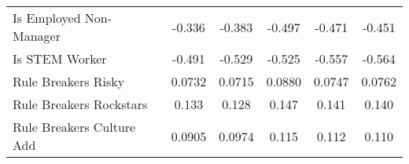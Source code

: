 {\begin{center}
{\begin{longtable}{l*{5}{c}}
            \addlinespace

            Is Employed Non-Manager          & -0.336                & -0.383\sym{*}         & -0.497\sym{**}        & -0.471\sym{**}        & -0.451\sym{**}        \\
            \addlinespace
            Is STEM Worker                   & -0.491\sym{**}        & -0.529\sym{**}        & -0.525\sym{**}        & -0.557\sym{**}        & -0.564\sym{**}        \\

            \addlinespace
            Rule Breakers Risky              & 0.0732\sym{*}         & 0.0715\sym{*}         & 0.0880\sym{**}        & 0.0747\sym{*}         & 0.0762\sym{*}         \\
            \addlinespace
            Rule Breakers Rockstars          & 0.133\sym{**}         & 0.128\sym{**}         & 0.147\sym{**}         & 0.141\sym{**}         & 0.140\sym{**}         \\
            \addlinespace
            Rule Breakers Culture Add        & 0.0905                & 0.0974\sym{*}         & 0.115\sym{**}         & 0.112\sym{**}         & 0.110\sym{**}         \\




\end{longtable}}
\end{center}}
